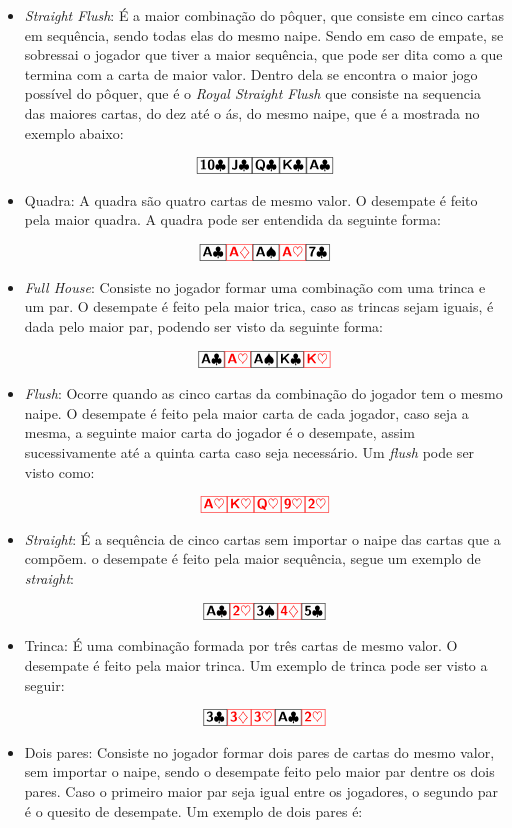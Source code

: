 \begin{itemize}
      \item \textit{Straight Flush}:
            É a maior combinação do pôquer, que consiste em cinco cartas em sequência, sendo todas elas do mesmo naipe. Sendo em caso de empate, se sobressai o jogador que tiver a maior sequência, que pode ser dita como a que termina com a carta de maior valor. Dentro dela se encontra o maior jogo possível do pôquer, que é o \textit{Royal Straight Flush} que consiste na sequencia das maiores cartas, do dez até o ás, do mesmo naipe, que é a mostrada no exemplo abaixo:

            $$ \tenc \Jc \Qc \Kc \Ac $$
      \item Quadra:
            A quadra são quatro cartas de mesmo valor. O desempate é feito pela maior quadra. A quadra pode ser entendida da seguinte forma:

            $$ \Ac \Ad \As \Ah \sevc$$
      \item \textit{Full House}:
            Consiste no jogador formar uma combinação com uma trinca e um par. O desempate é feito pela maior trica, caso as trincas sejam iguais, é dada pelo maior par, podendo ser visto da seguinte forma:

            $$ \Ac \Ah \As \Kc \Kh$$
      \item \textit{Flush}:
            Ocorre quando as cinco cartas da combinação do jogador tem o mesmo naipe. O desempate é feito pela maior carta de cada jogador, caso seja a mesma, a seguinte maior carta do jogador é o desempate, assim sucessivamente até a quinta carta caso seja necessário. Um \textit{flush} pode ser visto como:

            $$ \Ah \Kh \Qh \nineh \twoh$$

      \item \textit{Straight}:
            É a sequência de cinco cartas sem importar o naipe das cartas que a compõem. o desempate é feito pela maior sequência, segue um exemplo de \textit{straight}:

            $$ \Ac \twoh \tres \fourd \fivec$$
      \item Trinca:
            É uma combinação formada por três cartas de mesmo valor. O desempate é feito pela maior trinca. Um exemplo de trinca pode ser visto a seguir:

            $$ \trec \tred \treh \Ac \twoh$$
      \item Dois pares:
            Consiste no jogador formar dois pares de cartas do mesmo valor, sem importar o naipe, sendo o desempate feito pelo maior par dentre os dois pares. Caso o primeiro maior par seja igual entre os jogadores, o segundo par é o quesito de desempate. Um exemplo de dois pares é:


\end{itemize}
